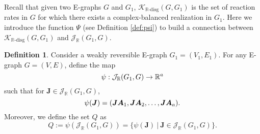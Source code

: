 \documentclass[11pt]{article}
\theoremstyle{plain}
\theoremstyle{definition}
\newtheorem{definition}[theorem]{Definition}
\newtheorem{remark}[theorem]{Remark}
\theoremstyle{remark}
\newcommand\RR{\mathbb{R}}
\newcommand\bw{\boldsymbol{w}}
\newcommand\bA{\boldsymbol{A}}
\newcommand\bB{\boldsymbol{B}}
\newcommand\bJ{\boldsymbol{J}}
\newcommand{\dK}{\mathcal{K}_{\RR\text{-disg}}}
\newcommand{\mJ}{\mathcal{J}_{\RR}}
\newcommand{\eJ}{\mathcal{J}_{\textbf{0}}}
\newcommand{\mD}{\mathcal{D}_{\textbf{0}}}
\begin{document}
Recall that given two E-graphs $G$ and $G_1$, $\dK (G, G_1)$ is the set of reaction rates in $G$ for which there exists a complex-balanced realization in $G_1$. Here we introduce the function $\Psi$ (see Definition \ref{def:psi}) to build a connection between $\dK (G, G_1)$ and $\mJ(G_1,G)$.







 



\begin{definition} \label{def:Q}
Consider a weakly reversible E-graph $G_1 = (V_1, E_1)$. For any E-graph $G = (V, E)$, define the map 
\begin{equation} \notag
\psi: \mJ(G_1,G) \rightarrow \mathbb{R}^a 
\end{equation}
such that for $\bJ \in \mJ(G_1,G)$, 
\begin{equation} \notag
\psi(\bJ) = (\bJ \bA_1, \bJ \bA_2, \ldots, \bJ \bA_a).
\end{equation}
Moreover, we define the set $Q$ as
\[
Q := \psi (\mJ(G_1,G)) = \{\psi(\bJ) \ | \ \bJ \in \mJ(G_1,G) \}.
\]
\end{definition}
\end{document}
